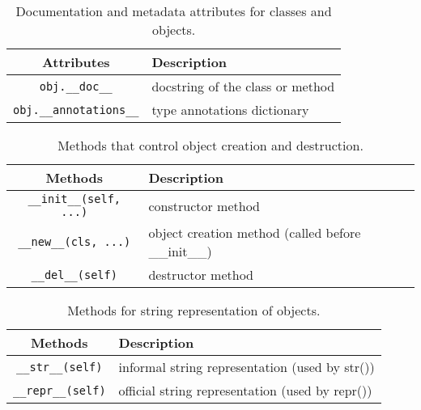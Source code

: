   \begin{definition}
    \begin{table}[H]
      \centering
      \begin{tabular}{|c|p{8cm}|}
        \hline
        \textbf{Attributes} & \textbf{Description} \\
        \hline 
        \texttt{obj.\_\_doc\_\_} & docstring of the class or method \\
        \hline
        \texttt{obj.\_\_annotations\_\_} & type annotations dictionary \\
        \hline
      \end{tabular}
      \caption{Documentation and metadata attributes for classes and objects.}
      \label{tab:documentation_metadata}
    \end{table}
  \end{definition}

  \begin{definition}
    \begin{table}[H]
      \centering
      \begin{tabular}{|c|p{8cm}|}
        \hline
        \textbf{Methods} & \textbf{Description} \\
        \hline 
        \texttt{\_\_init\_\_(self, ...)} & constructor method \\
        \hline
        \texttt{\_\_new\_\_(cls, ...)} & object creation method (called before \_\_init\_\_) \\
        \hline
        \texttt{\_\_del\_\_(self)} & destructor method \\
        \hline
      \end{tabular}
      \caption{Methods that control object creation and destruction.}
      \label{tab:object_lifecycle}
    \end{table}
  \end{definition}

  \begin{definition}
    \begin{table}[H]
      \centering
      \begin{tabular}{|c|p{8cm}|}
        \hline
        \textbf{Methods} & \textbf{Description} \\
        \hline 
        \texttt{\_\_str\_\_(self)} & informal string representation (used by str()) \\
        \hline
        \texttt{\_\_repr\_\_(self)} & official string representation (used by repr()) \\
        \hline
      \end{tabular}
      \caption{Methods for string representation of objects.}
      \label{tab:string_representation}
    \end{table}
  \end{definition}

